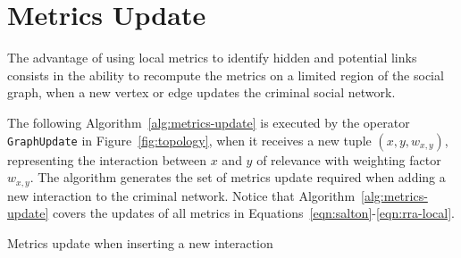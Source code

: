 \section{Metrics Update}
\label{sec:metrics-update}

The advantage of using local metrics to identify hidden and potential links consists in the ability to recompute the metrics on a limited region of the social graph, when a new vertex or edge updates the criminal social network.

The following Algorithm~\ref{alg:metrics-update} is executed by the operator \texttt{GraphUpdate} in Figure~\ref{fig:topology}, when it receives a new tuple $(x,y,w_{x,y})$, representing the interaction between $x$ and $y$ of relevance with weighting factor $w_{x,y}$. 
%
The algorithm generates the set of metrics update required when adding a new interaction to the criminal network.
%
Notice that Algorithm~\ref{alg:metrics-update} covers the updates of all metrics in Equations~\eqref{eqn:salton}-\eqref{eqn:rra-local}.
%
\begin{algorithm}[h!]
  
   {
  	




  }
  
  \caption{Metrics update when inserting a new interaction}
  \label{alg:metrics-update}
\end{algorithm}

